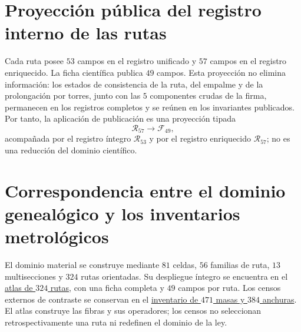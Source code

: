 \section{Proyección pública del registro interno de las rutas}

Cada ruta posee \(53\) campos en el registro unificado y \(57\) campos en el
registro enriquecido. La ficha científica publica \(49\) campos. Esta
proyección no elimina información: los estados de consistencia de la ruta,
del empalme y de la prolongación por torres, junto con las \(5\) componentes
crudas de la firma, permanecen en los registros completos y se reúnen en los
invariantes publicados. Por tanto, la aplicación de publicación es una
proyección tipada
\[
  \mathcal R_{57}\longrightarrow\mathcal F_{49},
\]
acompañada por el registro íntegro \(\mathcal R_{53}\) y por el registro
enriquecido \(\mathcal R_{57}\); no es una reducción del dominio científico.

\section{Correspondencia entre el dominio genealógico y los inventarios metrológicos}

El dominio material se construye mediante \(81\) celdas, \(56\) familias de
ruta, \(13\) multisecciones y \(324\) rutas orientadas. Su despliegue íntegro
se encuentra en el
\hyperref[chap:atlas-genealogico-exhaustivo-324-rutas]{atlas de \(324\)
rutas}, con una ficha completa y \(49\) campos por ruta. Los censos externos
de contraste se conservan en el
\hyperref[chap:inventario-universal-471-masas-384-anchuras]{inventario de
\(471\) masas y \(384\) anchuras}. El atlas construye las fibras y sus
operadores; los censos no seleccionan retrospectivamente una ruta ni
redefinen el dominio de la ley.
